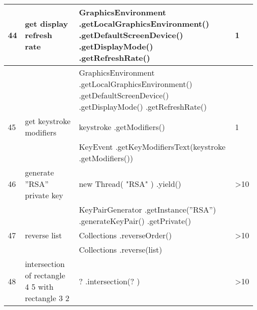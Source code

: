 \begin{longtable}{|p{}|p{}|p{}|p{}|}
		\rowcolor[HTML]{FFCCC9} 
		44                                & get display refresh rate                               & GraphicsEnvironment .getLocalGraphicsEnvironment() .getDefaultScreenDevice() .getDisplayMode() .getRefreshRate() & 1                                       \\ \hline
		\rowcolor[HTML]{9AFF99} 
		&                                                        & GraphicsEnvironment .getLocalGraphicsEnvironment() .getDefaultScreenDevice() .getDisplayMode() .getRefreshRate() &                                         \\ \hline
		\rowcolor[HTML]{FFCCC9} 
		45                                & get keystroke modifiers                                & keystroke  .getModifiers()                                                                                       & 1                                       \\ \hline
		\rowcolor[HTML]{9AFF99} 
		&                                                        & KeyEvent .getKeyModifiersText(keystroke .getModifiers())                                                         &                                         \\ \hline
		\rowcolor[HTML]{FFCCC9} 
		46                                & generate ”RSA” private key                             & new Thread( "RSA" ) .yield()                                                                                     & \textgreater{}10                        \\ \hline
		\rowcolor[HTML]{9AFF99} 
		&                                                        & KeyPairGenerator .getInstance(”RSA”) .generateKeyPair() .getPrivate()                                            &                                         \\ \hline
		\rowcolor[HTML]{FFCCC9} 
		47                                & reverse list                                           & Collections .reverseOrder()                                                                                      & \textgreater{}10                        \\ \hline
		\rowcolor[HTML]{9AFF99} 
		&                                                        & Collections .reverse(list)                                                                                       &                                         \\ \hline
		\rowcolor[HTML]{FFCCC9} 
		48                                & intersection of rectangle 4 5 with rectangle 3 2       & ? .intersection(? )                                                                                              & \textgreater{}10                        \\ \hline

\end{longtable}
